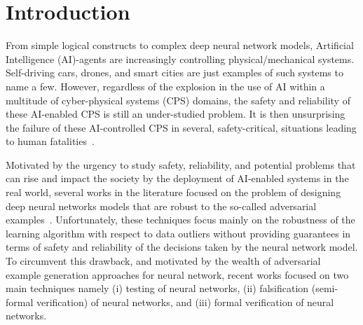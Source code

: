 \section{Introduction}
From simple logical constructs to complex deep neural network models, Artificial Intelligence (AI)-agents are increasingly controlling physical/mechanical systems. Self-driving cars, drones, and smart cities are just examples of such systems to name a few. However, regardless of the explosion in the use of AI within a multitude of cyber-physical systems (CPS) domains, the safety and reliability of these AI-enabled CPS is still an under-studied problem. It is then unsurprising the failure of these AI-controlled CPS in several, safety-critical, situations leading to human fatalities~\cite{AccidentWiki}. 



Motivated by the urgency to study safety, reliability, and potential problems that can rise and impact the society by the deployment of AI-enabled systems in the real world, several works in the literature focused on the problem of designing deep neural networks models that are robust to the so-called adversarial examples~\cite{ferdowsi2018robust,everitt2018agi,charikar2017learning,steinhardt2017certified,munoz2017towards,paudice2018label,ruan2018global}. Unfortunately, these techniques focus mainly on the robustness of the learning algorithm with respect to data outliers without providing guarantees in terms of safety and reliability of the decisions taken by the neural network model. To circumvent this drawback, and motivated by the wealth of adversarial example generation approaches for neural network, recent works focused on two main techniques namely (i) testing of neural networks, (ii) falsification (semi-formal verification) of neural networks, and (iii) formal verification of neural networks.

